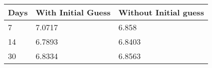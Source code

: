 \begin{tabular}{lll}
Days & With Initial Guess & Without Initial guess \\ 
\hline 
7 & 7.0717 & 6.858 \\ 
14 & 6.7893 & 6.8403 \\ 
30 & 6.8334 & 6.8563 \\ 
\hline 
\end{tabular}